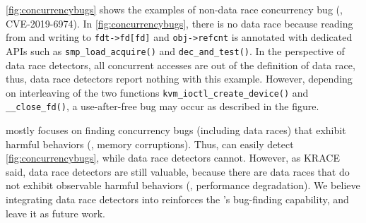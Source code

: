 %
%
\autoref{fig:concurrencybugs} shows the examples of non-data race
concurrency bug (\ie, CVE-2019-6974).
%
In \autoref{fig:concurrencybugs}, there is no data race because
reading from and writing to \texttt{fdt->fd[fd]} and
\texttt{obj->refcnt} is annotated with dedicated APIs such as
\texttt{smp_load_acquire()} and \texttt{dec_and_test()}.
%
In the perspective of data race detectors, all concurrent accesses are
out of the definition of data race, thus, data race detectors report
nothing with this example.
%
However, depending on interleaving of the two functions
\texttt{kvm_ioctl_create_device()} and \texttt{__close_fd()}, a
use-after-free bug may occur as described in the figure.



%
\sys mostly focuses on finding concurrency bugs (including data races)
that exhibit harmful behaviors (\eg, memory corruptions). Thus, \sys
can easily detect \autoref{fig:concurrencybugs}, while data race
detectors cannot.
%
However, as KRACE said, data race detectors are still valuable,
because there are data races that do not exhibit observable harmful
behaviors (\ie, performance degradation).
%
We believe integrating data race detectors into \sys reinforces the
\sys's bug-finding capability, and leave it as future work.


